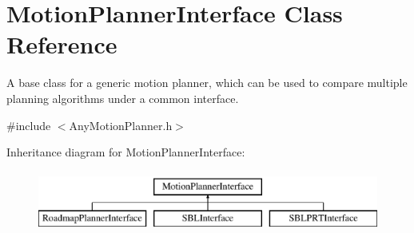 \section{Motion\+Planner\+Interface Class Reference}
\label{classMotionPlannerInterface}


A base class for a generic motion planner, which can be used to compare multiple planning algorithms under a common interface.  




{\ttfamily \#include $<$Any\+Motion\+Planner.\+h$>$}

Inheritance diagram for Motion\+Planner\+Interface\+:\begin{figure}[H]
\begin{center}
\leavevmode
\includegraphics[height=2.000000cm]{classMotionPlannerInterface}
\end{center}
\end{figure}
